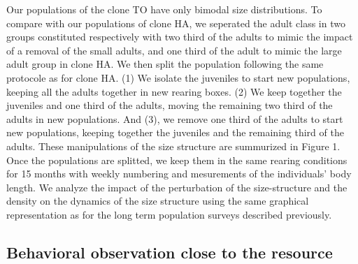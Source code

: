 Our populations of the clone TO have only bimodal size distributions. To compare
with our populations of clone HA, we seperated the adult class in two groups
constituted respectively with two third of the adults to mimic the impact of a
removal of the small adults, and one third of the adult to mimic the large adult
group in clone HA. We then split the population following the same protocole as
for clone HA. (1) We isolate the juveniles to start new populations, keeping all
the adults together in new rearing boxes. (2) We keep together the juveniles and
one third of the adults, moving the remaining two third of the adults in new
populations. And (3), we remove one third of the adults to start new
populations, keeping together the juveniles and the remaining third of the
adults. These manipulations of the size structure are summurized in Figure 1.
Once the populations are splitted, we keep them in the same rearing conditions
for 15 months with weekly numbering and mesurements of the individuals' body
length. We analyze the impact of the perturbation of the size-structure and the
density on the dynamics of the size structure using the same graphical
representation as for the long term population surveys described previously.

\subsection{Behavioral observation close to the resource}

